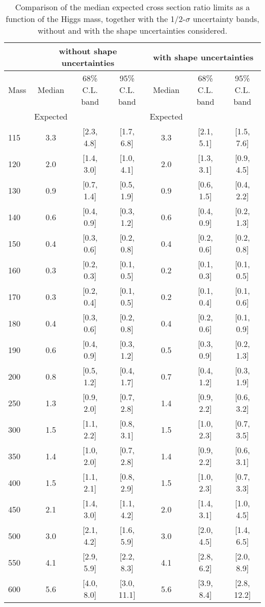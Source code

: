 \begin{table}[!ht]
\begin{center}
{\normalsize
\begin{tabular}{|l|c|c|c|c|c|c|}
\hline
      &  \multicolumn{3}{c|}{without shape uncertainties} &\multicolumn{3}{c|}{with shape uncertainties} \\
\hline
Mass  &  Median      &     68\% C.L. band &  95\% C.L. band &  Median	   &	 68\% C.L. band &  95\% C.L. band\\
      &  Expected    &                    &                 &  Expected    &			&		 \\
\hline
115 &  3.3 & [2.3, 4.8] & [1.7, 6.8]  &  3.3 & [2.1, 5.1] & [1.5, 7.6] \\
120 &  2.0 & [1.4, 3.0] & [1.0, 4.1]  &  2.0 & [1.3, 3.1] & [0.9, 4.5] \\
130 &  0.9 & [0.7, 1.4] & [0.5, 1.9]  &  0.9 & [0.6, 1.5] & [0.4, 2.2] \\
140 &  0.6 & [0.4, 0.9] & [0.3, 1.2]  &  0.6 & [0.4, 0.9] & [0.2, 1.3] \\
150 &  0.4 & [0.3, 0.6] & [0.2, 0.8]  &  0.4 & [0.2, 0.6] & [0.2, 0.8] \\
160 &  0.3 & [0.2, 0.3] & [0.1, 0.5]  &  0.2 & [0.1, 0.3] & [0.1, 0.5] \\
170 &  0.3 & [0.2, 0.4] & [0.1, 0.5]  &  0.2 & [0.1, 0.4] & [0.1, 0.6] \\
180 &  0.4 & [0.3, 0.6] & [0.2, 0.8]  &  0.4 & [0.2, 0.6] & [0.1, 0.9] \\
190 &  0.6 & [0.4, 0.9] & [0.3, 1.2]  &  0.5 & [0.3, 0.9] & [0.2, 1.3] \\
200 &  0.8 & [0.5, 1.2] & [0.4, 1.7]  &  0.7 & [0.4, 1.2] & [0.3, 1.9] \\
250 &  1.3 & [0.9, 2.0] & [0.7, 2.8]  &  1.4 & [0.9, 2.2] & [0.6, 3.2] \\
300 &  1.5 & [1.1, 2.2] & [0.8, 3.1]  &  1.5 & [1.0, 2.3] & [0.7, 3.5] \\
350 &  1.4 & [1.0, 2.0] & [0.7, 2.8]  &  1.4 & [0.9, 2.2] & [0.6, 3.1] \\
400 &  1.5 & [1.1, 2.1] & [0.8, 2.9]  &  1.5 & [1.0, 2.3] & [0.7, 3.3] \\
450 &  2.1 & [1.4, 3.0] & [1.1, 4.2]  &  2.0 & [1.4, 3.1] & [1.0, 4.5] \\
500 &  3.0 & [2.1, 4.2] & [1.6, 5.9]  &  3.0 & [2.0, 4.5] & [1.4, 6.5] \\
550 &  4.1 & [2.9, 5.9] & [2.2, 8.3]  &  4.1 & [2.8, 6.2] & [2.0, 8.9] \\
600 &  5.6 & [4.0, 8.0] & [3.0, 11.1] &  5.6 & [3.9, 8.4] & [2.8, 12.2]\\
\hline
\end{tabular}
}
\caption{Comparison of the median expected cross section ratio limits as a function 
of the Higgs mass, together with the 1/2-$\sigma$ uncertainty bands, without and with the 
shape uncertainties considered.}
\label{tab:mva_shapewithwithout}
\end{center}
\end{table}


